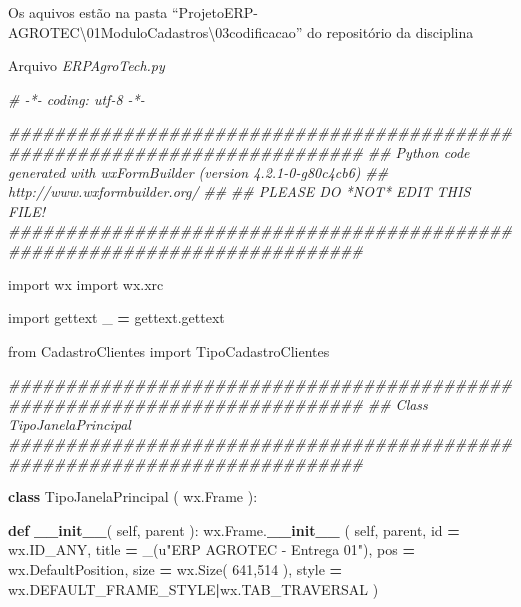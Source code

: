 \documentclass[
]{book}
\newenvironment{Shaded}{\begin{snugshade}}{\end{snugshade}}
\newcommand{\BuiltInTok}[1]{#1}
\newcommand{\CommentTok}[1]{\textcolor[rgb]{0.56,0.35,0.01}{\textit{#1}}}
\newcommand{\DecValTok}[1]{\textcolor[rgb]{0.00,0.00,0.81}{#1}}
\newcommand{\FunctionTok}[1]{\textcolor[rgb]{0.13,0.29,0.53}{\textbf{#1}}}
\newcommand{\ImportTok}[1]{#1}
\newcommand{\KeywordTok}[1]{\textcolor[rgb]{0.13,0.29,0.53}{\textbf{#1}}}
\newcommand{\NormalTok}[1]{#1}
\newcommand{\OperatorTok}[1]{\textcolor[rgb]{0.81,0.36,0.00}{\textbf{#1}}}
\newcommand{\StringTok}[1]{\textcolor[rgb]{0.31,0.60,0.02}{#1}}
\newcommand{\VariableTok}[1]{\textcolor[rgb]{0.00,0.00,0.00}{#1}}
\begin{document}
Os aquivos estão na pasta ``ProjetoERP-AGROTEC\textbackslash01ModuloCadastros\textbackslash03codificacao\source'' do repositório da disciplina

Arquivo \emph{ERPAgroTech.py}

\begin{Shaded}
\begin{Highlighting}[]

\CommentTok{\# {-}*{-} coding: utf{-}8 {-}*{-}}

\CommentTok{\#\#\#\#\#\#\#\#\#\#\#\#\#\#\#\#\#\#\#\#\#\#\#\#\#\#\#\#\#\#\#\#\#\#\#\#\#\#\#\#\#\#\#\#\#\#\#\#\#\#\#\#\#\#\#\#\#\#\#\#\#\#\#\#\#\#\#\#\#\#\#\#\#\#\#}
\CommentTok{\#\# Python code generated with wxFormBuilder (version 4.2.1{-}0{-}g80c4cb6)}
\CommentTok{\#\# http://www.wxformbuilder.org/}
\CommentTok{\#\#}
\CommentTok{\#\# PLEASE DO *NOT* EDIT THIS FILE!}
\CommentTok{\#\#\#\#\#\#\#\#\#\#\#\#\#\#\#\#\#\#\#\#\#\#\#\#\#\#\#\#\#\#\#\#\#\#\#\#\#\#\#\#\#\#\#\#\#\#\#\#\#\#\#\#\#\#\#\#\#\#\#\#\#\#\#\#\#\#\#\#\#\#\#\#\#\#\#}

\ImportTok{import}\NormalTok{ wx}
\ImportTok{import}\NormalTok{ wx.xrc}

\ImportTok{import}\NormalTok{ gettext}
\NormalTok{\_ }\OperatorTok{=}\NormalTok{ gettext.gettext}


\ImportTok{from}\NormalTok{ CadastroClientes }\ImportTok{import}\NormalTok{ TipoCadastroClientes}

\CommentTok{\#\#\#\#\#\#\#\#\#\#\#\#\#\#\#\#\#\#\#\#\#\#\#\#\#\#\#\#\#\#\#\#\#\#\#\#\#\#\#\#\#\#\#\#\#\#\#\#\#\#\#\#\#\#\#\#\#\#\#\#\#\#\#\#\#\#\#\#\#\#\#\#\#\#\#}
\CommentTok{\#\# Class TipoJanelaPrincipal}
\CommentTok{\#\#\#\#\#\#\#\#\#\#\#\#\#\#\#\#\#\#\#\#\#\#\#\#\#\#\#\#\#\#\#\#\#\#\#\#\#\#\#\#\#\#\#\#\#\#\#\#\#\#\#\#\#\#\#\#\#\#\#\#\#\#\#\#\#\#\#\#\#\#\#\#\#\#\#}

\KeywordTok{class}\NormalTok{ TipoJanelaPrincipal ( wx.Frame ):}

   \KeywordTok{def} \FunctionTok{\_\_init\_\_}\NormalTok{( }\VariableTok{self}\NormalTok{, parent ):}
\NormalTok{       wx.Frame.}\FunctionTok{\_\_init\_\_}\NormalTok{ ( }\VariableTok{self}\NormalTok{, parent, }\BuiltInTok{id} \OperatorTok{=}\NormalTok{ wx.ID\_ANY, title }\OperatorTok{=}\NormalTok{ \_(}\StringTok{u"ERP AGROTEC {-} Entrega 01"}\NormalTok{), pos }\OperatorTok{=}\NormalTok{ wx.DefaultPosition, size }\OperatorTok{=}\NormalTok{ wx.Size( }\DecValTok{641}\NormalTok{,}\DecValTok{514}\NormalTok{ ), style }\OperatorTok{=}\NormalTok{ wx.DEFAULT\_FRAME\_STYLE}\OperatorTok{|}\NormalTok{wx.TAB\_TRAVERSAL )}


\end{Highlighting}
\end{Shaded}
\end{document}
